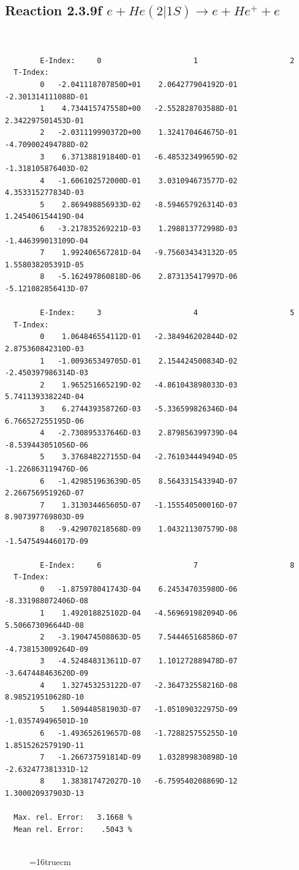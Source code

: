 \documentclass[12pt,dvips]{article}
\begin{document}
\subsection{
Reaction 2.3.9f  $e + He(2|1S) \rightarrow e + He^+ + e  $
}



\begin{small}\begin{verbatim}


        E-Index:     0                     1                     2
  T-Index:
        0   -2.041118707850D+01    2.064277904192D-01   -2.301314111088D-01
        1    4.734415747558D+00   -2.552828703588D-01    2.342297501453D-01
        2   -2.031119990372D+00    1.324170464675D-01   -4.709002494788D-02
        3    6.371388191840D-01   -6.485323499659D-02   -1.318105876403D-02
        4   -1.606102572000D-01    3.031094673577D-02    4.353315277834D-03
        5    2.869498856933D-02   -8.594657926314D-03    1.245406154419D-04
        6   -3.217835269221D-03    1.298813772998D-03   -1.446399013109D-04
        7    1.992406567281D-04   -9.756034343132D-05    1.558038205391D-05
        8   -5.162497860818D-06    2.873135417997D-06   -5.121082856413D-07

        E-Index:     3                     4                     5
  T-Index:
        0    1.064846554112D-01   -2.384946202844D-02    2.875360842310D-03
        1   -1.009365349705D-01    2.154424500834D-02   -2.450397986314D-03
        2    1.965251665219D-02   -4.861043898033D-03    5.741139338224D-04
        3    6.274439358726D-03   -5.336599826346D-04    6.766527255195D-06
        4   -2.730895337646D-03    2.879856399739D-04   -8.539443051056D-06
        5    3.376848227155D-04   -2.761034449494D-05   -1.226863119476D-06
        6   -1.429851963639D-05    8.564331543394D-07    2.266756951926D-07
        7    1.313034465605D-07   -1.155540500016D-07    8.907397769803D-09
        8   -9.429070218568D-09    1.043211307579D-08   -1.547549446017D-09

        E-Index:     6                     7                     8
  T-Index:
        0   -1.875978041743D-04    6.245347035980D-06   -8.331988072406D-08
        1    1.492018825102D-04   -4.569691982094D-06    5.506673096644D-08
        2   -3.190474508863D-05    7.544465168586D-07   -4.738153009264D-09
        3   -4.524848313611D-07    1.101272889478D-07   -3.647448463620D-09
        4    1.327453253122D-07   -2.364732558216D-08    8.985219510628D-10
        5    1.509448581903D-07   -1.051090322975D-09   -1.035749496501D-10
        6   -1.493652619657D-08   -1.728825755255D-10    1.851526257919D-11
        7   -1.266737591814D-09    1.032899830898D-10   -2.632477381331D-12
        8    1.383817472027D-10   -6.759540208869D-12    1.300020937903D-13

  Max. rel. Error:   3.1668 %
  Mean rel. Error:    .5043 %


\end{verbatim}\end{small}
\begin{figure} \label{2.3.9f}
\epsfxsize=16truecm
\end{figure}
\newpage
\end{document}
